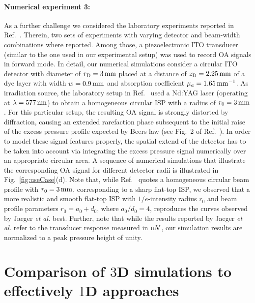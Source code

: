 \documentclass[12pt]{iopart}
\begin{document}
\paragraph{Numerical experiment 3:}
As a further challenge we considered the laboratory experiments reported in
Ref.\ \cite{Jaeger:2005}. Therein, two sets of experiments with varying
detector and beam-width combinations where reported. Among those, a
piezoelectronic ITO transducer (similar to the one used in our experimental
setup) was used to record OA signals in forward mode.  In detail, 
our numerical simulations consider a circular ITO detector with diameter of $r_{\rm D}=3\,{\rm mm}$ placed at a
distance of $z_{\rm D}=2.25\,{\rm mm}$ of a dye layer with
width $w=0.9 \,{\rm mm}$ and absorption coefficient $\mu_a=1.65\,{\rm
mm}^{-1}$.  As irradiation source, the laboratory setup in Ref.\ \cite{Jaeger:2005} 
used a Nd:YAG laser (operating at $\lambda = 577\,{\rm nm}$) to obtain a
homogeneous circular ISP with a radius of $r_0=3\,{\rm mm}$.  For this
particular setup, the resulting OA signal is strongly distorted by diffraction,
causing an extended rarefaction phase subsequent to the initial raise of the
excess pressure profile expected by Beers law (see Fig.\ 2 of Ref.\
\cite{Jaeger:2005}). In order to model these signal features properly, the
spatial extend of the detector has to be taken into account via integrating the
excess pressure signal numerically over an appropriate circular area. A
sequence of numerical simulations that illustrate the corresponding OA signal
for different detector radii is illustrated in Fig.\ \ref{fig:useCase}(d).
Note that, while Ref.\ \cite{Jaeger:2005} quotes a homogeneous circular beam
profile with $r_0=3\,{\rm mm}$, corresponding to a sharp flat-top ISP, we
observed that a more realistic and smooth flat-top ISP with $1/e$-intensity
radius $r_0$ and beam profile parameters $r_0=a_0+d_0$, where $a_0/d_0=4$,
reproduces the curves observed by Jaeger {\emph{ et al.}} best.
Further, note that while the results reported by Jaeger {\emph{et al.}} refer
to the transducer response measured in ${\rm mV}$, our simulation results 
are normalized to a peak pressure height of unity. 

\section{Comparison of $3$D simulations to effectively $1$D approaches}
\label{sec:appendixB}
\end{document}
